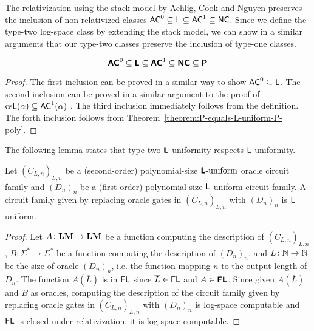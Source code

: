 \documentclass[envcountsame,orivec,oribibl]{llncs}
\begin{document}
The relativization using the stack model by Aehlig, Cook and Nguyen preserves
the inclusion of non-relativized classes
$\mathsf{AC}^0 \subseteq \mathsf{L} \subseteq \mathsf{AC}^1 \subseteq \mathsf{NC}$.
Since we define the type-two log-space class by extending the stack model,
we can show in a similar arguments 
that our type-two classes preserve the inclusion of type-one classes.

\begin{theorem}
\label{theorem:inclusion}
\begin{equation}
 \text{\bfseries \sffamily \upshape AC}^0
 \subseteq \text{\bfseries \sffamily \upshape L} 
 \subseteq \text{\bfseries \sffamily \upshape AC}^1
 \subseteq \text{\bfseries \sffamily \upshape NC}
 \subseteq \text{\bfseries \sffamily \upshape P}
\end{equation}
\end{theorem}

\begin{proof}
 The first inclusion can be proved in a similar way
 to show $\mathsf{AC}^0 \subseteq \mathsf{L}$.
 The second inclusion can be proved in a similar argument to 
 the proof of $\text{cs}\mathsf{L}(\alpha) \subseteq \mathsf{AC}^1(\alpha)$
 \cite{aehlig2007relativizing}.
 The third inclusion immediately follows from the definition.
 The forth inclusion follows from Theorem~\ref{theorem:P-equals-L-uniform-P-poly}.
\end{proof}


The following lemma states that type-two $\text{\bfseries \sffamily \upshape L}$ uniformity respects
$\mathsf{L}$ uniformity.

\begin{lemma}
 Let $(C_{L,n})_{L,n}$ be a (second-order) polynomial-size $\text{\bfseries \sffamily \upshape L}\text{-uniform}$ oracle circuit family
 and $(D_n)_n$ be a (first-order) polynomial-size $\mathsf{L}$-uniform circuit family.
 A circuit family given by replacing oracle gates in $(C_{L,n})_{L,n}$ with
 $(D_n)_n$ is $\mathsf{L}$ uniform.
\end{lemma}

\begin{proof}
 Let $A \colon \mathbf{LM} \to \mathbf{LM}$ be a function computing the description of $(C_{L,n})_{L,n}$,
 $B \colon \Sigma^* \to \Sigma^*$ be a function computing the description of $(D_n)_n$, and
 $L \colon \mathbb N \to \mathbb N$ be the size of oracle $(D_n)_n$, i.e.
 the function mapping $n$ to the output length of $D_n$.
 The function $A(\overline{L})$ is in $\mathsf{FL}$ since $\overline{L} \in \mathsf{FL}$ and $A \in \text{\bfseries \sffamily \upshape FL}$.
 Since given $A(\overline{L})$ and $B$ as oracles,
 computing the description of the circuit family given by replacing oracle
 gates in $(C_{L,n})_{L,n}$ with $(D_n)_n$ is log-space computable
 and $\mathsf{FL}$ is closed under relativization,
 it is log-space computable.
\end{proof}
\end{document}
